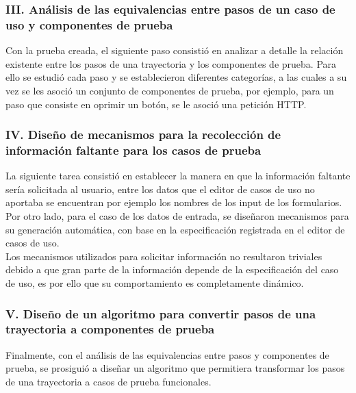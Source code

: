 \subsubsection*{III. Análisis de las equivalencias entre pasos de un caso de uso y componentes de  prueba}

	Con la prueba creada, el siguiente paso consistió en analizar a detalle la relación existente entre los pasos de una trayectoria y los componentes de prueba. Para ello se estudió cada paso y se establecieron diferentes categorías, a las cuales a su vez se les asoció un conjunto de componentes de prueba, por ejemplo, para un paso que consiste en oprimir un botón, se le asoció una petición HTTP.
	
	
	\subsubsection*{IV. Diseño de mecanismos para la recolección de información faltante para los casos de prueba}

	La siguiente tarea consistió en establecer la manera en que la información faltante sería solicitada al usuario, entre los datos que el editor de casos de uso no aportaba se encuentran por ejemplo los nombres de los input de los formularios.\\
	
	 Por otro lado, para el caso de los datos de entrada, se diseñaron mecanismos para su generación automática, con base en la especificación registrada en el editor de casos de uso.\\
	
	 Los mecanismos utilizados para solicitar información no resultaron triviales debido a que gran parte de la información depende de la especificación del caso de uso, es por ello que su comportamiento es completamente dinámico.
	

	\subsubsection*{V. Diseño de un algoritmo para convertir pasos de una trayectoria a componentes de prueba}
	
	Finalmente, con el análisis de las equivalencias entre pasos y componentes de prueba, se prosiguió a diseñar un algoritmo que permitiera transformar los pasos de una trayectoria a casos de prueba funcionales.\\
	